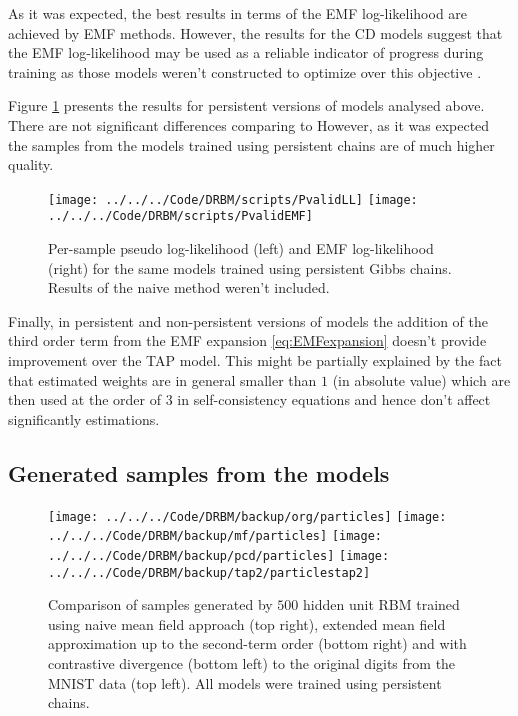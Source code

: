 \documentclass[../report/report.tex]{subfiles}
\begin{document}
As it was expected, the best results in terms of the EMF log-likelihood are achieved by EMF methods. However, the results for the CD models suggest that the EMF log-likelihood may be used as a reliable indicator of progress during training as those models weren't constructed to optimize over this objective \cite{gabrie2015training}.

Figure \ref{fig:PvalidLL} presents the results for persistent versions of models analysed above. There are not significant differences comparing to However, as it was expected the samples from the models trained using persistent chains are of much higher quality.
\begin{figure}[!htb]
 \texttt{[image: ../../../Code/DRBM/scripts/PvalidLL]}
\endminipage 
{}  
 \texttt{[image: ../../../Code/DRBM/scripts/PvalidEMF]}
\endminipage\hfill
  \caption[1]{Per-sample pseudo log-likelihood (left) and EMF log-likelihood (right) for the same models trained using persistent Gibbs chains. Results of the naive method weren't included.}
   \label{fig:PvalidLL}
\end{figure}

Finally, in persistent and non-persistent versions of models the addition of the third order term from the EMF expansion \ref{eq:EMFexpansion} doesn't provide improvement over the TAP model. This might be partially explained by the fact that estimated weights are in general smaller than $1$ (in absolute value) which are then used at the order of $3$ in self-consistency equations and hence don't affect significantly estimations.

\subsection{Generated samples from the models}

\begin{figure}[!htb]
%
 \texttt{[image: ../../../Code/DRBM/backup/org/particles]}
\endminipage 
\hfill
{}  
 \texttt{[image: ../../../Code/DRBM/backup/mf/particles]}
\endminipage
\vspace{2em}
 \texttt{[image: ../../../Code/DRBM/backup/pcd/particles]}
\endminipage 
\hfill
{}  
 \texttt{[image: ../../../Code/DRBM/backup/tap2/particlestap2]}
\endminipage
  \caption[1]{Comparison of samples generated by $500$ hidden unit RBM trained using naive mean field approach (top right), extended mean field approximation up to the second-term order (bottom right) and with contrastive divergence (bottom left) to the original digits from the MNIST data (top left). All models were trained using persistent chains.}
  \label{fig:particles}
\end{figure}
\end{document}
